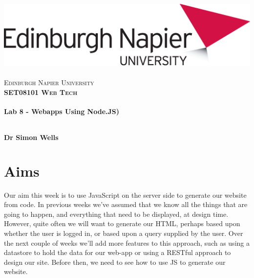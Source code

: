\documentclass[10pt, a4paper, twosize]{article}
\begin{document}

\begin{titlepage}
\vspace*{5cm}
\begin{center}
\includegraphics[width=.5\textwidth]{images/EdNapUniLogoCMYK}~\\[1cm]

\textsc{\Large Edinburgh Napier University}\\[1.5cm]

\textsc{\LARGE \bfseries SET08101 Web Tech}\\[0.5cm]

\hrulefill \\[0.4cm]
{\huge \bfseries Lab 8 - Webapps Using Node.JS) \\[0.4cm] }
\hrulefill \\[1.5cm]

\begin{minipage}{0.4\textwidth}
\begin{flushleft} \large
\textbf{Dr Simon Wells} \\
\end{flushleft}
\end{minipage}

\vfill

\end{center}
\end{titlepage}




%

\section{Aims}
\paragraph{} Our aim this week is to use JavaScript on the server side to generate our website from code. In previous weeks we've assumed that we know all the things that are going to happen, and everything that need to be displayed, at design time. However, quite often we will want to generate our HTML, perhaps based upon whether the user is logged in, or based upon a query supplied by the user. Over the next couple of weeks we'll add more features to this approach, such as using a datastore to hold the data for our web-app or using a RESTful approach to design our site. Before then, we need to see how to use JS to generate our website.
\end{document}
